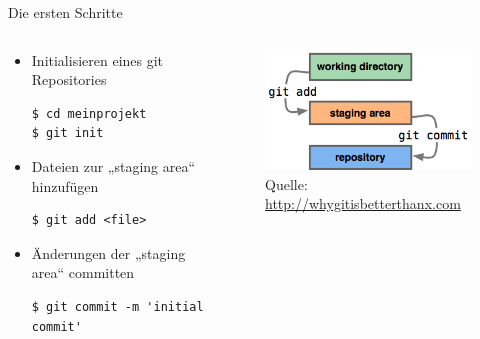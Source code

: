 \begin{frame}[fragile]{Die ersten Schritte}
  \begin{columns}
    \begin{column}{0.65\textwidth}
      \begin{itemize}
        \item Initialisieren eines git Repositories
        \begin{lstlisting}
$ cd meinprojekt
$ git init
        \end{lstlisting}
        \item Dateien zur „staging area“ hinzufügen
        \begin{lstlisting}
$ git add <file>
        \end{lstlisting}
        \item Änderungen der „staging area“ committen
        \begin{lstlisting}
$ git commit -m 'initial commit'
        \end{lstlisting}
      \end{itemize}
    \end{column}
    \begin{column}{0.35\textwidth}
      \begin{figure}
        \includegraphics[width=\textwidth]{img/addcommit}
        \caption[format=empty]{Quelle: \url{http://whygitisbetterthanx.com}}
      \end{figure}
    \end{column}
  \end{columns}
\end{frame}

